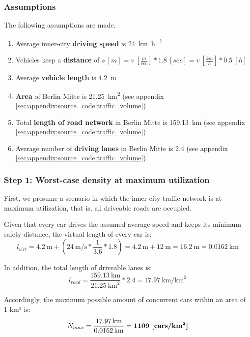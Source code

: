 \subsubsection{Assumptions}
The following assumptions are made.

\begin{samepage}
\begin{enumerate}
	\item Average inner-city \textbf{driving speed} is \SI{24}{\kilo\meter\per\hour} \cite{Forbes2008}
	\item Vehicles keep a \textbf{distance} of $s \ [m] = v \ [\frac{m}{sec}] * 1.8 \ [sec] = v \  [\frac{km}{h}] * 0.5 \ [h]$ \cite{wiki:sicherheitsabstand}
	\item Average \textbf{vehicle length} is \SI{4.2}{\meter}
	\item \textbf{Area} of Berlin Mitte is \SI{21.25}{\square\kilo\meter} (see appendix \cref{sec:appendix:source_code:traffic_volume})
	\item Total \textbf{length of road network} in Berlin Mitte is \SI{159.13}{\kilo\meter} (see appendix \cref{sec:appendix:source_code:traffic_volume})
	\item Average number of \textbf{driving lanes} in Berlin Mitte is 2.4 (see appendix \cref{sec:appendix:source_code:traffic_volume})
\end{enumerate}
\end{samepage}

\subsubsection{Step 1: Worst-case density at maximum utilization}
First, we presume a scenario in which the inner-city traffic network is at maximum utilization, that is, all driveable roads are occupied.

Given that every car drives the assumed average speed and keeps its minimum safety distance, the virtual length of every car is: $$l_{virt} = \SI{4.2}{\meter} + (\SI{24}{\meter\per\second} * \frac{1}{3.6} * 1.8) = \SI{4.2}{\meter} + \SI{12}{\meter} = \SI{16.2}{\meter} = \SI{0.0162}{\km}$$

In addition, the total length of driveable lanes is:
$$l_{road} = \frac{\SI{159.13}{\km}}{\SI{21.25}{\square\km}} * 2.4 = \SI{17.97}{\km\per\square\km}$$

Accordingly, the maximum possible amount of concurrent cars within an area of 1 km² is:
$$N_{max} = \frac{\SI{17.97}{\km}}{\SI{0.0162}{\km}} = \textbf{1109 [\si[detect-weight]{cars\per\square\km}]}$$


